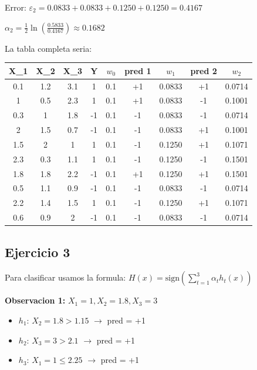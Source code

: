 \documentclass[12pt]{article}
\begin{document}
Error: $\varepsilon_2 = 0.0833 + 0.0833 + 0.1250 + 0.1250 = 0.4167$

\vspace{1em}

$\alpha_2 = \frac{1}{2} \ln\left(\frac{0.5833}{0.4167}\right) \approx 0.1682$

\vspace{1em}

La tabla completa seria:

\begin{center}
\begin{tabular}{|c|c|c|c|c|c|c|c|c|}
    \hline
    X\_1 & X\_2 & X\_3 & Y & $w_0$ & pred 1 & $w_1$ & pred 2 & $w_2$ \\
    \hline
    0.1 & 1.2 & 3.1 & 1  & 0.1 & +1 & 0.0833 & +1 & 0.0714 \\
    \hline
    1   & 0.5 & 2.3 & 1  & 0.1 & +1 & 0.0833 & -1 & 0.1001 \\
    \hline
    0.3 & 1   & 1.8 & -1 & 0.1 & -1 & 0.0833 & -1 & 0.0714 \\
    \hline
    2   & 1.5 & 0.7 & -1 & 0.1 & -1 & 0.0833 & +1 & 0.1001 \\
    \hline
    1.5 & 2   & 1   & 1  & 0.1 & -1 & 0.1250 & +1 & 0.1071 \\
    \hline
    2.3 & 0.3 & 1.1 & 1  & 0.1 & -1 & 0.1250 & -1 & 0.1501 \\
    \hline
    1.8 & 1.8 & 2.2 & -1 & 0.1 & +1 & 0.1250 & +1 & 0.1501 \\
    \hline
    0.5 & 1.1 & 0.9 & -1 & 0.1 & -1 & 0.0833 & -1 & 0.0714 \\
    \hline
    2.2 & 1.4 & 1.5 & 1  & 0.1 & -1 & 0.1250 & +1 & 0.1071 \\
    \hline
    0.6 & 0.9 & 2   & -1 & 0.1 & -1 & 0.0833 & -1 & 0.0714 \\
    \hline
\end{tabular}
\end{center}

\subsection{Ejercicio 3}

Para clasificar usamos la formula: $H(x) = \text{sign}\left(\sum_{t=1}^{3} \alpha_t h_t(x)\right)$

\vspace{0.5em}

\textbf{Observacion 1: } $X_1 = 1, X_2 = 1.8, X_3 = 3$

\begin{itemize}
    \item $h_1$: $X_2 = 1.8 > 1.15$ $\rightarrow$ pred = +1
    \item $h_2$: $X_3 = 3 > 2.1$ $\rightarrow$ pred = +1
    \item $h_3$: $X_1 = 1 \leq 2.25$ $\rightarrow$ pred = +1
\end{itemize}
\end{document}
